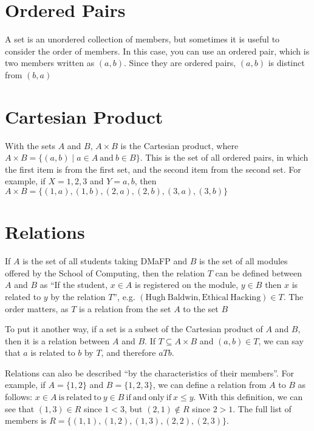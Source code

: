 
\section*{Ordered Pairs}

A set is an unordered collection of members, but sometimes it is useful to consider the order of members. In this
 case, you can use an ordered pair, which is two members written as $(a, b)$. Since they are ordered pairs, $(a, b)$ is
 distinct from $(b, a)$

\section*{Cartesian Product}

With the sets $A$ and $B$, $A \times B$ is the Cartesian product, where $A \times B = \{(a, b) \mid a \in A \mathrm{\ and\ } b \in B\}$.
This is the set of all ordered pairs, in which the first item is from the first set, and the second item from the second
 set. For example, if $X = {1, 2, 3}$ and $Y = {a, b}$, then
 $A \times B = \{(1, a), (1, b), (2, a), (2, b), (3, a), (3, b)\}$

\section*{Relations}

If $A$ is the set of all students taking DMaFP and $B$ is the set of all modules offered by the School of Computing,
 then the relation $T$ can be defined between $A$ and $B$ as ``If the student, $x \in A$ is registered on the module, 
 $y \in B$ then $x$ is related to $y$ by the relation $T$'', e.g.
 $(\mathrm{Hugh\ Baldwin}, \mathrm{Ethical\ Hacking}) \in T$. The order matters, as $T$ is a relation from the set $A$ to
 the set $B$

To put it another way, if a set is a subset of the Cartesian product of $A$ and $B$, then it is a relation between $A$
 and $B$. If $T \subseteq A \times B$ and $(a, b) \in T$, we can say that $a$ is related to $b$ by $T$, and therefore
 $aTb$.

Relations can also be described ``by the characteristics of their members''. For example, if $A = \{1, 2\}$ and
 $B = \{1, 2, 3\}$, we can define a relation from $A$ to $B$ as follows:
 $x \in A \mathrm{\ is\ related\ to\ } y \in B \mathrm{\ if\ and\ only\ if\ } x \leq y$. With this definition, we can
 see that $(1, 3) \in R$ since $1 < 3$, but $(2, 1) \notin R$ since $2 > 1$. The full list of members is
 $R = \{(1, 1), (1, 2), (1, 3), (2, 2), (2, 3)\}$.


